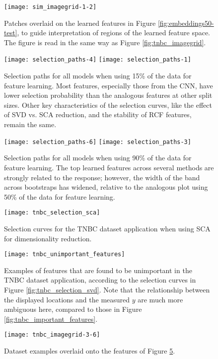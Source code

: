 \begin{figure}
  \centering
  \texttt{[image: sim\_imagegrid-1-2]}
  \caption{Patches overlaid on the learned features in Figure
    \ref{fig:embeddings50-test}, to guide interpretation of regions of the
    learned feature space. The figure is read in the same way as Figure
    \ref{fig:tnbc_imagegrid}.}
  \label{fig:sim_imagegrid-1-2}
\end{figure}

\begin{figure}
  \centering
  \texttt{[image: selection\_paths-4]}
  \texttt{[image: selection\_paths-1]}
  \caption{Selection paths for all models when using 15\% of the data for
    feature learning. Most features, especially those from the CNN, have lower selection
    probability than the analogous features at other split sizes. Other key
    characteristics of the selection curves, like the effect of SVD vs. SCA
    reduction, and the stability of RCF features, remain the same.}
  \label{fig:selection_paths15}
\end{figure}

\begin{figure}
  \centering
  \texttt{[image: selection\_paths-6]}
  \texttt{[image: selection\_paths-3]}
  \caption{Selection paths for all models when using 90\% of the data for
    feature learning. The top learned features across several methods are
    strongly related to the response; however, the width of the band across
    bootstraps has widened, relative to the analogous plot using 50\% of the
    data for feature learning.}
  \label{fig:selection_paths90}
\end{figure}

\begin{figure}
  \centering
  \texttt{[image: tnbc\_selection\_sca]}
  \caption{Selection curves for the TNBC dataset application when using SCA for
    dimensionality reduction.}
  \label{fig:tnbc_selection_sca}
\end{figure}

\begin{figure}
  \centering
  \texttt{[image: tnbc\_unimportant\_features]}
  \caption{Examples of features that are found to be unimportant in the TNBC
    dataset application, according to the selection curves in Figure
    \ref{fig:tnbc_selection_svd}. Note that the relationship between the
    displayed locations and the measured $y$ are much more ambiguous here,
    compared to those in Figure \ref{fig:tnbc_important_features}.}
  \label{fig:tnbc_unimportant_features}
\end{figure}

\begin{figure}
  \centering
  \texttt{[image: tnbc\_imagegrid-3-6]}
  \label{fig:tnbc_imagegrid-3-6}
  \caption{Dataset examples overlaid onto the features of Figure
    \ref{fig:tnbc_unimportant_features}.}
\end{figure}
